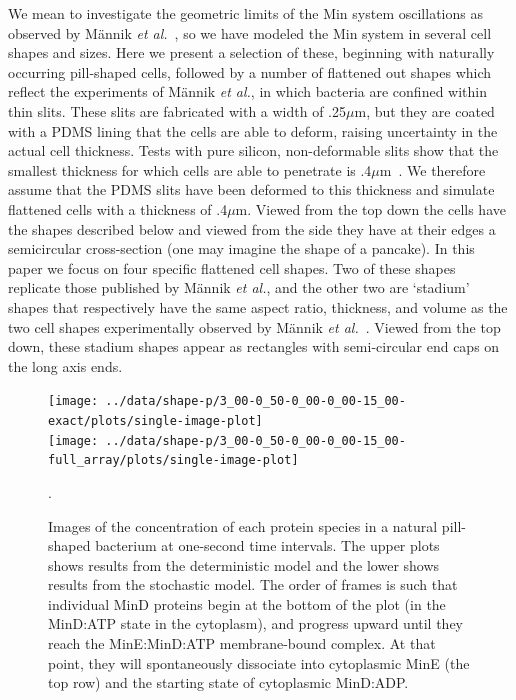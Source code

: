 \documentclass[10pt,letterpaper]{article}
\newcommand\micron{\ensuremath{\mu\text{m}}}
\begin{document}
We mean to investigate the geometric limits of the Min system
oscillations as observed by M\"annik \emph{et
  al.}~\cite{mannik2012robustness}, so we have modeled the Min system
in several cell shapes and sizes.  Here we present a selection of
these, beginning with naturally occurring pill-shaped cells, followed
by a number of flattened out shapes which reflect the experiments of
M\"annik \emph{et al.}, in which bacteria are confined within thin
slits.  These slits are fabricated with a width of .25\micron, but
they are coated with a PDMS lining that the cells are able to deform,
raising uncertainty in the actual cell thickness.  Tests with pure
silicon, non-deformable slits show that the smallest thickness for
which cells are able to penetrate is
.4\micron~\cite{mannik2012robustness,mannik2009bacterial}.  We
therefore assume that the PDMS slits have been deformed to this
thickness and simulate flattened cells with a thickness of .4\micron.
Viewed from the top down the cells have the shapes described below and
viewed from the side they have at their edges a semicircular
cross-section (one may imagine the shape of a pancake).
%
In this paper we focus on four specific flattened cell shapes.  Two of
these shapes replicate those published by M\"annik \emph{et al.}, and
the other two are `stadium' shapes that respectively have the same
aspect ratio, thickness, and volume as the two cell shapes
experimentally observed by M\"annik \emph{et
  al.}~\cite{mannik2012robustness}.  Viewed from the top down, these
stadium shapes appear as rectangles with semi-circular end caps on the
long axis ends.

\begin{figure}
  \begin{center}
    \hspace{-3.5cm}
    \texttt{[image: ../data/shape-p/3\_00-0\_50-0\_00-0\_00-15\_00-exact/plots/single-image-plot]}\\
    \vspace{-1.5em}
    \hspace{-3.5cm}
    \texttt{[image: ../data/shape-p/3\_00-0\_50-0\_00-0\_00-15\_00-full\_array/plots/single-image-plot]}
    \vspace{-1.5em}
  \end{center}
  \caption{Images of the concentration of each protein species in a
    natural pill-shaped bacterium at one-second time intervals. The
    upper plots shows results from the deterministic model and the
    lower shows results from the stochastic model.  The order of
    frames is such that individual MinD proteins begin at the bottom
    of the plot (in the MinD:ATP state in the cytoplasm), and progress
    upward until they reach the MinE:MinD:ATP membrane-bound complex.
    At that point, they will spontaneously dissociate into cytoplasmic
    MinE (the top row) and the starting state of cytoplasmic
    MinD:ADP.}.
  \label{image-p}
\end{figure}
\end{document}
